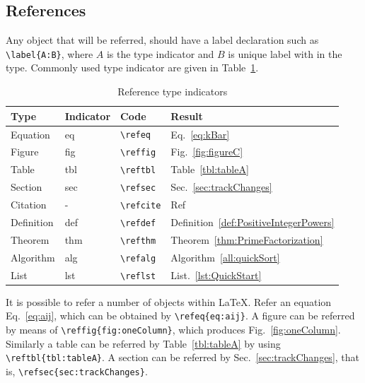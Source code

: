 \documentclass[10pt,journal,compsoc]{IEEEtran}
\newcommand{\reffig}[1]{Fig.~\ref{#1}}
\newcommand{\refeq}[1]{Eq.~\ref{#1}}
\newcommand{\reftbl}[1]{Table~\ref{#1}}
\newcommand{\refsec}[1]{Sec.~\ref{#1}}
\newcommand{\refcite}[1]{Ref~\cite{#1}}
\newcommand{\refalg}[1]{Algorithm~\ref{#1}}
\newcommand{\reflst}[1]{List.~\ref{#1}}  %
\newcommand{\refthm}[1]{Theorem~\ref{#1}}
\newcommand{\refdef}[1]{Definition~\ref{#1}}
\theoremstyle{plain}
\theoremstyle{definition}
\theoremstyle{remark}
\begin{document}
\subsection{References}

Any object that will be referred,
should have a label declaration such as
\verb!\label{A:B}!,
where 
$A$ is the type indicator and
$B$ is unique label with in the type.
Commonly used type indicator are given in \reftbl{tbl:TypeIndicators}.

\begin{table}[th]
	\caption{Reference type indicators}
	\begin{center}
	\begin{tabular}{|l |l |l |l |}
		\hline
		Type
		&Indicator
		&Code
		&Result\\
		\hline
		Equation
		&eq
		&\verb!\refeq!
		&\refeq{eq:kBar}\\
		Figure
		&fig
		&\verb!\reffig!
		&\reffig{fig:figureC}\\
		Table
		&tbl
		&\verb!\reftbl!
		&\reftbl{tbl:tableA}\\
		Section
		&sec
		&\verb!\refsec!
		&\refsec{sec:trackChanges}\\
		Citation
		&-
		&\verb!\refcite!
		&\refcite{chomsky1993}\\
		Definition
		&def
		&\verb!\refdef!
		&\refdef{def:PositiveIntegerPowers}\\
		Theorem
		&thm
		&\verb!\refthm!
		&\refthm{thm:PrimeFactorization}\\
		Algorithm
		&alg
		&\verb!\refalg!
		&\refalg{all:quickSort}\\
		List
		&lst
		&\verb!\reflst!
		&\reflst{lst:QuickStart}\\
		\hline
	\end{tabular}
	\end{center}
	\label{tbl:TypeIndicators}
\end{table}%


It is possible to refer a number of objects within \LaTeX.
Refer an equation \refeq{eq:aij}, which can be obtained by \verb!\refeq{eq:aij}!. 
A figure can be referred by means of \verb!\reffig{fig:oneColumn}!, which produces \reffig{fig:oneColumn}.
Similarly a table can be referred by \reftbl{tbl:tableA} by using \verb!\reftbl{tbl:tableA}!.
A section can be referred by \refsec{sec:trackChanges}, 
that is, 
\verb!\refsec{sec:trackChanges}!.
\end{document}
